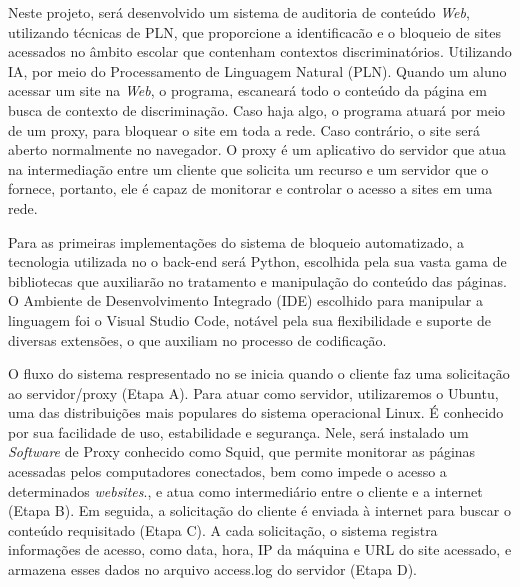 

Neste projeto, será desenvolvido um sistema de auditoria de conteúdo \textit{Web}, utilizando técnicas de PLN, que proporcione a identificacão e o bloqueio de sites acessados no âmbito escolar que contenham contextos discriminatórios. Utilizando IA, por meio do Processamento de Linguagem Natural (PLN). Quando um aluno acessar um site na \textit{Web}, o programa, escaneará todo o conteúdo da página em busca de contexto de discriminação. Caso haja algo, o programa atuará por meio de um proxy, para bloquear o site em toda a rede. Caso contrário, o site será aberto normalmente no navegador.
O proxy é um aplicativo do servidor que atua na intermediação entre um cliente que solicita um recurso e um servidor que o fornece, portanto, ele é capaz de monitorar e controlar o acesso a sites em uma rede. 

Para as primeiras implementações do sistema de bloqueio automatizado, a tecnologia utilizada no o back-end será Python, escolhida pela sua vasta gama de bibliotecas que auxiliarão no tratamento e manipulação do conteúdo das páginas. O Ambiente de Desenvolvimento Integrado (IDE) escolhido para manipular a linguagem foi o Visual Studio Code, notável pela sua flexibilidade e suporte de diversas extensões, o que auxiliam no processo de codificação.

O fluxo do sistema respresentado no  se inicia quando o cliente faz uma solicitação ao servidor/proxy (Etapa A). Para atuar como servidor, utilizaremos o Ubuntu, uma das distribuições mais populares do sistema operacional Linux. É conhecido por sua facilidade de uso, estabilidade e segurança.\textcite{ubuntu-desktop} Nele, será instalado um \textit{Software} de Proxy conhecido como Squid, que permite monitorar as páginas acessadas pelos computadores conectados, bem como impede o acesso a determinados \textit{websites}.\cite{squid-cache}, e atua como intermediário entre o cliente e a internet (Etapa B). Em seguida, a solicitação do cliente é enviada à internet para buscar o conteúdo requisitado (Etapa C).
A cada solicitação, o sistema registra informações de acesso, como data, hora, IP da máquina e URL do site acessado, e armazena esses dados no arquivo access.log do servidor (Etapa D).

